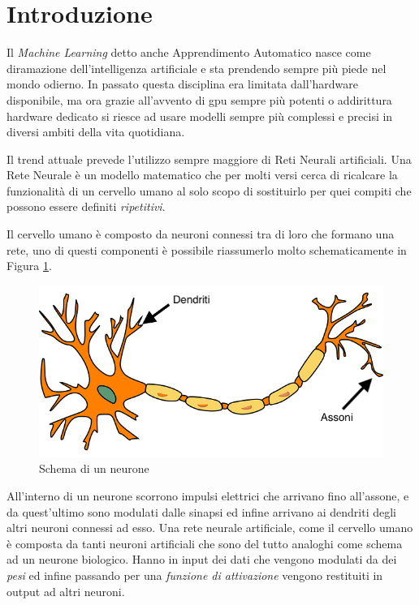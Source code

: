 \chapter*{Introduzione}
Il \textit{Machine Learning} detto anche Apprendimento Automatico nasce come diramazione dell'intelligenza artificiale e sta prendendo sempre più piede nel mondo odierno.  
In passato questa disciplina era limitata dall'hardware disponibile, ma ora grazie all'avvento di \ac{gpu} sempre più potenti o addirittura hardware dedicato
si riesce ad usare modelli sempre più complessi e precisi in diversi ambiti della vita quotidiana. 

Il trend attuale prevede l'utilizzo sempre maggiore di Reti Neurali artificiali. Una Rete Neurale è un modello matematico che per molti versi cerca di ricalcare la funzionalità 
di un cervello umano al solo scopo di sostituirlo per quei compiti che possono essere definiti \textit{ripetitivi}. 

Il cervello umano è composto da neuroni connessi tra di loro che formano una rete, uno di questi componenti è possibile riassumerlo molto schematicamente in Figura \ref{fig:neurone}. 
\begin{figure}[]
    \centering
    \includegraphics[width = \textwidth]{images/neurone.png}
    \caption{Schema di un neurone}
    \label{fig:neurone}
\end{figure}
All'interno di un neurone scorrono impulsi elettrici che arrivano fino all'assone, e da quest'ultimo sono modulati dalle sinapsi ed infine 
arrivano ai dendriti degli altri neuroni connessi ad esso. 
Una rete neurale artificiale, come il cervello umano è composta da tanti neuroni artificiali che sono del tutto analoghi come schema ad un neurone biologico. Hanno in input dei dati che vengono 
modulati da dei \textit{pesi} ed infine passando per una \textit{funzione di attivazione} vengono restituiti in output ad altri neuroni. 

